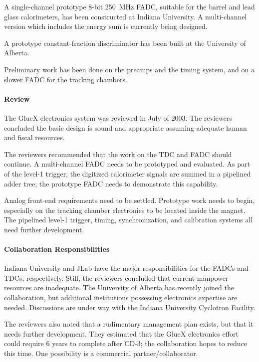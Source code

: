 \documentclass[11pt]{article}
\begin{document}
A single-channel prototype 8-bit 250~MHz FADC, suitable for the barrel
and lead glass calorimeters, has been constructed at Indiana
University.  A multi-channel version which includes the energy sum is
currently being designed.

 A prototype constant-fraction discriminator has been built at the University of Alberta.

Preliminary work has been done on the preamps and
the timing system, and on a slower FADC for the tracking chambers.




\paragraph{Review}

The GlueX electronics system was reviewed in July of 2003.  The
reviewers concluded the basic design is sound and appropriate assuming
adequate human and fiscal resources.

The reviewers recommended that the work on the TDC and FADC should
continue.  A multi-channel FADC needs to be prototyped and evaluated.
As part of the level-1 trigger, the digitized calorimeter signals are
summed in a pipelined adder tree; the prototype FADC needs to
demonstrate this capability.

Analog front-end requirements need to be settled.  Prototype work
needs to begin, especially on the tracking chamber electronics to be
located inside the magnet.  The pipelined level-1 trigger, timing,
synchronization, and calibration systems all need further development.



\paragraph{Collaboration Responsibilities}

Indiana University and JLab have the major responsibilities for the
FADCs and TDCs, respectively. Still, 
the reviewers concluded that current manpower resources are
inadequate.  The University of Alberta has recently joined the
collaboration, but additional institutions possessing electronics
expertise are needed.  Discussions are under way with the Indiana University
Cyclotron Facility.

The reviewers also noted that a rudimentary management plan exists, but
that it needs further development.  
They estimated that the GlueX electronics effort could
require 6 years to complete after CD-3; the collaboration hopes to
reduce this time.  One possibility is a commercial partner/collaborator.
\end{document}
